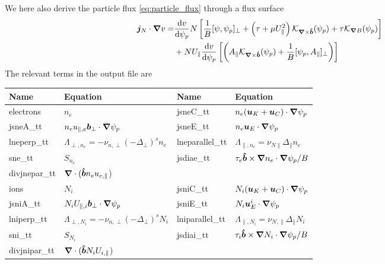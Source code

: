We here also derive the particle flux \eqref{eq:particle_flux} through a flux surface
\begin{align} \label{eq:radial_particle_flux}
 \vec j_{N}\cn v %
 =&
  \frac{\d v}{\d \psi_p} N\left[\frac{1}{B}[\psi, \psi_p]_\perp + \left(\tau + \mu U_\parallel^2\right)
   \mathcal K_{\vn\times\bhat}(\psi_p) + \tau  \mathcal K_{\vn B}(\psi_p) \right] \nonumber\\
 &+ NU_\parallel\frac{\d v}{\d \psi_p}\left [\left( A_\parallel \mathcal
 K_{\vn\times\bhat}(\psi_p) + \frac{1}{B}[\psi_p, A_\parallel]_\perp\right) \right]
\end{align}
The relevant terms in the output file are
\begin{longtable}{llll}
\toprule
\rowcolor{gray!50}\textbf{Name} &  \textbf{Equation} & \textbf{Name} &  \textbf{Equation}\\
\midrule
    electrons & $n_e$ &
    jsneC\_tt &$ n_e ( {\boldsymbol{u}}_K + {\boldsymbol{u}}_C )\cdot{\boldsymbol{\nabla}} \psi_p$ \\
    jsneA\_tt &$ n_e u_{\parallel,e} {\boldsymbol{ b}}_\perp  \cdot{\boldsymbol{\nabla}} \psi_p$ &
    jsneE\_tt & $ n_e {\boldsymbol{u}}_E\cdot{\boldsymbol{\nabla}}\psi_p$ \\
    lneperp\_tt &$ \Lambda_{\perp,n_e} = -\nu_{n,\perp} (-\Delta_\perp)^s n_e$&
    lneparallel\_tt &$ \Lambda_{\parallel,n_e} = \nu_{N\parallel} \Delta_\parallel n_e$ \\
    sne\_tt & $S_{n_e}$ &
    jsdiae\_tt & $\tau_e \bm{\hat{b}} \times {\boldsymbol{\nabla}} n_e \cdot{\boldsymbol{\nabla}} \psi_p /B$\\
    divjnepar\_tt & ${\boldsymbol{\nabla}}\cdot (\bm{\hat{b}} n_e u_{e,\parallel}$) &
    & \\
    ions & $N_i$ &
    jsniC\_tt &$ N_i ( {\boldsymbol{u}}_K + {\boldsymbol{u}}_C )\cdot{\boldsymbol{\nabla}} \psi_p$ \\
    jsniA\_tt &$ N_i U_{\parallel,i} {\boldsymbol{ b}}_\perp  \cdot{\boldsymbol{\nabla}} \psi_p$ &
    jsniE\_tt & $ N_i {\boldsymbol{u}}^i_E\cdot{\boldsymbol{\nabla}}\psi_p$ \\
    lniperp\_tt &$ \Lambda_{\perp,N_i} = -\nu_{n,\perp} (-\Delta_\perp)^s N_i$&
    lniparallel\_tt &$ \Lambda_{\parallel,N_i} = \nu_{N,\parallel} \Delta_\parallel N_i$ \\
    sni\_tt & $S_{N_i}$ &
    jsdiai\_tt & $\tau_i \bm{\hat{b}} \times {\boldsymbol{\nabla}} N_i \cdot{\boldsymbol{\nabla}} \psi_p /B$\\
    divjnipar\_tt & ${\boldsymbol{\nabla}}\cdot (\bm{\hat{b}} N_i U_{i,\parallel}$) &
      & \\
\bottomrule
\end{longtable}

